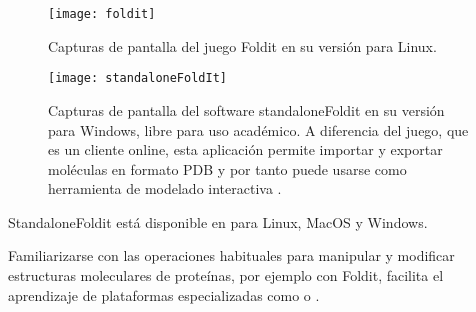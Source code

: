 \begin{figure}
\begin{center} 
\texttt{[image: foldit]}
\caption%
{
Capturas de pantalla del juego Foldit en su versi\'{o}n para Linux.
}
\label{fig:foldit}
\end{center}
\end{figure}

\begin{figure}
\begin{center} 
\texttt{[image: standaloneFoldIt]}
\caption%
{
Capturas de pantalla del software standaloneFoldit en su versi\'{o}n para Windows, libre para 
uso acad\'{e}mico. A diferencia del juego, que es un cliente online, 
esta aplicaci\'{o}n permite importar y exportar mol\'{e}culas en formato PDB y por tanto puede usarse 
como herramienta de modelado interactiva \citep{Kleffner2017}. 
}
\label{fig:standalonefoldit}
\end{center}
\end{figure}

StandaloneFoldit est\'{a} disponible en
 para Linux, MacOS y Windows. 

Familiarizarse con las operaciones habituales para manipular y modificar estructuras moleculares de prote\'{i}nas,
por ejemplo con Foldit, facilita el aprendizaje de plataformas especializadas como 
 o .
